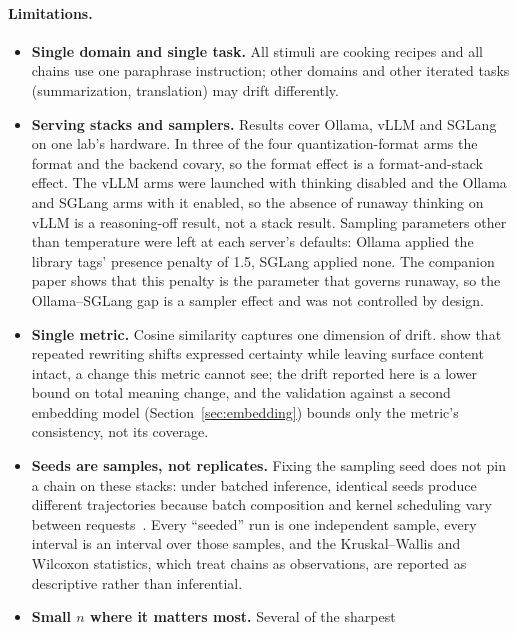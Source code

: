 \documentclass[11pt]{article}
\begin{document}
\paragraph{Limitations.}
\label{sec:limitations}
\begin{itemize}[leftmargin=*]
  \item \textbf{Single domain and single task.} All stimuli are cooking
        recipes and all chains use one paraphrase instruction; other
        domains and other iterated tasks (summarization, translation) may
        drift differently.
  \item \textbf{Serving stacks and samplers.} Results cover Ollama, vLLM
        and SGLang on one lab's hardware. In three of the four
        quantization-format arms the format and the backend covary, so the
        format effect is a format-and-stack effect. The vLLM arms were
        launched with thinking disabled and the Ollama and SGLang arms with
        it enabled, so the absence of runaway thinking on vLLM is a
        reasoning-off result, not a stack result. Sampling parameters other
        than temperature were left at each server's defaults: Ollama applied
        the library tags' presence penalty of 1.5, SGLang applied none. The
        companion paper shows that this penalty is the parameter that
        governs runaway, so the Ollama--SGLang gap is a sampler effect and
        was not controlled by design.
  \item \textbf{Single metric.} Cosine similarity captures one dimension of
        drift. \citet{belem2026certainty} show that repeated rewriting shifts
        expressed certainty while leaving surface content intact, a change
        this metric cannot see; the drift reported here is a lower bound on
        total meaning change, and the validation against a second embedding
        model (Section~\ref{sec:embedding}) bounds only the metric's
        consistency, not its coverage.
  \item \textbf{Seeds are samples, not replicates.} Fixing the sampling seed
        does not pin a chain on these stacks: under batched inference,
        identical seeds produce different trajectories because batch
        composition and kernel scheduling vary between
        requests~\citep{he2025nondeterminism}. Every ``seeded'' run is one
        independent sample, every interval is an interval over those
        samples, and the Kruskal--Wallis and Wilcoxon statistics, which
        treat chains as observations, are reported as descriptive rather
        than inferential.
  \item \textbf{Small $n$ where it matters most.} Several of the sharpest

\end{itemize}
\end{document}
